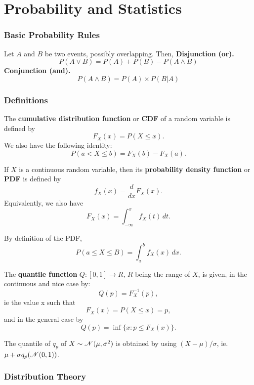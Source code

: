 \part{Probability and Statistics}

\section{Basic Probability Rules}
\begin{outline}
Let $A$ and $B$ be two events, possibly overlapping. Then,
\1 \textbf{Disjunction (or).} 
\[
  P(A\vee B) = P(A) + P(B) - P(A \wedge B)
\]
\1 \textbf{Conjunction (and).}
\[
  P(A\wedge B) = P(A)\times P(B|A)
\]
\end{outline}

\section{Definitions}
\begin{outline}
\1 The \textbf{cumulative distribution function} or \textbf{CDF} of a random variable is
defined by
\[
  F_X(x) = P(X\leq x).
\]
We also have the following identity:
\[
  P(a<X\leq b) = F_X(b) - F_X(a).
\]

\1 If $X$ is a continuous random variable, then its \textbf{probability density function}
or \textbf{PDF} is defined by
\[
  f_X(x) = \frac{d}{dx}F_X(x).
\]
Equivalently, we also have
\[
  F_X(x) = \int_{-\infty}^x f_X(t)\,dt.
\]

\1 By definition of the PDF, 
\[
  P(a\leq X\leq B) = \int_{a}^bf_X(x)\,dx.
\]

\1 The \textbf{quantile function} $Q:[0,1]\to R$, $R$ being the range of $X$, is given, in
the continuous and nice case by:
\[
  Q(p) = F_X^{-1}(p),
\]
ie the value x such that 
\[
  F_X(x) = P(X\leq x) = p,
\]
and in the general case by
\[
  Q(p) = \inf\{x: p\leq F_X(x)\}.
\]

\1 The quantile of $q_p$ of $X\sim\mathscr{N}(\mu,\sigma^2)$ is obtained by using
$(X-\mu)/\sigma$, ie. $\mu + \sigma q_p(\mathscr{N}(0,1))$.

\end{outline}

\section{Distribution Theory}

